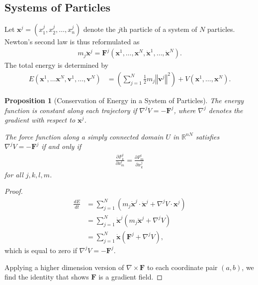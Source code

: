 \documentclass[10pt]{extarticle}
\newcommand{\R}{\mathbb{R}}
\newcommand{\norm}[1]{\left\Vert #1\right\Vert}
\theoremstyle{plain}
\newtheorem*{proposition}{Proposition}%
\theoremstyle{definition}
\theoremstyle{remark}
\renewcommand{\newline}{\hfill\break}
\begin{document}
  \subsection{Systems of Particles}%
  Let $\mathbf{x}^j = \left(x_{1}^j,x_2^j,\dots,x_n^j\right)$ denote the $j$th particle of a system of $N$ particles. Newton's second law is thus reformulated as
  \begin{align*}
    m_j\mathbf{\ddot{x}}^j = \mathbf{F}^j\left(\mathbf{x}^1,\dots,\mathbf{x}^N,\mathbf{\dot{x}}^1,\dots,\mathbf{\dot{x}}^N\right).
  \end{align*}
  The total energy is determined by
  \begin{align*}
    E(\mathbf{x}^1,\dots\mathbf{x}^N,\mathbf{v}^1,\dots,\mathbf{v}^N) &= \left(\sum_{j=1}^{N}\frac{1}{2}m_j\norm{\mathbf{v}^j}^2\right) + V(\mathbf{x}^1,\dots,\mathbf{x}^N).
  \end{align*}
  \begin{proposition}[Conservation of Energy in a System of Particles]
    
  The energy function is constant along each trajectory if $\nabla^{j}V = -\mathbf{F}^j$, where $\nabla^j$ denotes the gradient with respect to $\mathbf{x}^j$.\newline

  The force function along a simply connected domain $U$ in $\R^{nN}$ satisfies $\nabla^j V = -\mathbf{F}^j$ if and only if
  \begin{align*}
    \frac{\partial F_{k}^j}{\partial x_m^l} = \frac{\partial F_m^l}{\partial x_k^j}
  \end{align*}
  for all $j,k,l,m$.
  \end{proposition}
  \begin{proof}
      \begin{align*}
        \frac{dE}{dt} &= \sum_{j=1}^{N}\left(m_j\mathbf{\dot{x}}^j\cdot\mathbf{\ddot{x}}^j + \nabla^{j}V\cdot \mathbf{x}^j\right)\\
                      &= \sum_{j=1}^{N}\mathbf{\dot{x}}^j\left(m_j\mathbf{\ddot{x}}^j + \nabla^jV\right)\\
                      &= \sum_{j=1}^{N}\mathbf{\dot{x}}\left(\mathbf{F}^j + \nabla^j V\right),
      \end{align*}
      which is equal to zero if $\nabla^j V = -\mathbf{F}^j$.\newline

      Applying a higher dimension version of $\nabla \times \mathbf{F}$ to each coordinate pair $(a,b)$, we find the identity that shows $\mathbf{F}$ is a gradient field.
  \end{proof}
\end{document}
